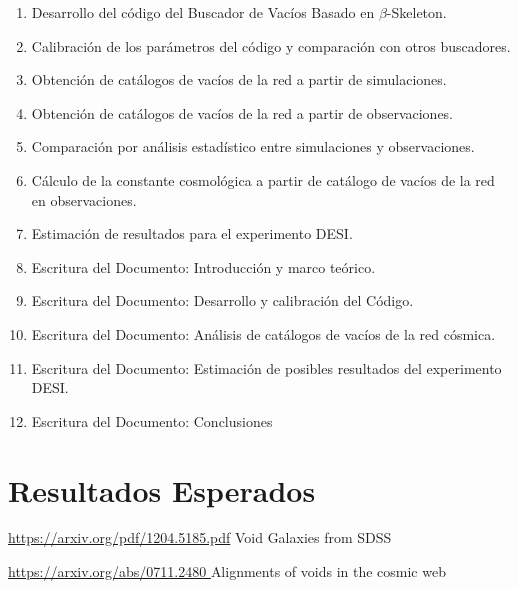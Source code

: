 \documentclass[preprint]{aastex62}
\begin{document}
  
  \begin{enumerate}
  \item Desarrollo del código del Buscador de Vacíos Basado en $\beta$-Skeleton.
  \item Calibración de los parámetros del código y comparación con otros buscadores.
  \item Obtención de catálogos de vacíos de la red a partir de simulaciones.
  \item Obtención de catálogos de vacíos de la red a partir de observaciones.
  \item Comparación por análisis estadístico entre simulaciones y observaciones.
  \item Cálculo de la constante cosmológica a partir de catálogo de vacíos de la red en
    observaciones.
  \item Estimación de resultados para el experimento DESI.
  \item Escritura del Documento: Introducción y marco teórico.
  \item Escritura del Documento: Desarrollo y calibración del Código.
  \item Escritura del Documento: Análisis de catálogos de vacíos de la red cósmica. 
  \item Escritura del Documento: Estimación de posibles resultados del experimento DESI.
  \item Escritura del Documento: Conclusiones
  \end{enumerate}
  
  
  \section{Resultados Esperados}

  \url{  https://arxiv.org/pdf/1204.5185.pdf} Void Galaxies from SDSS

  \url{  https://arxiv.org/abs/0711.2480 } Alignments of voids in the cosmic web

  

  
    
  \nocite{*}
\end{document}
